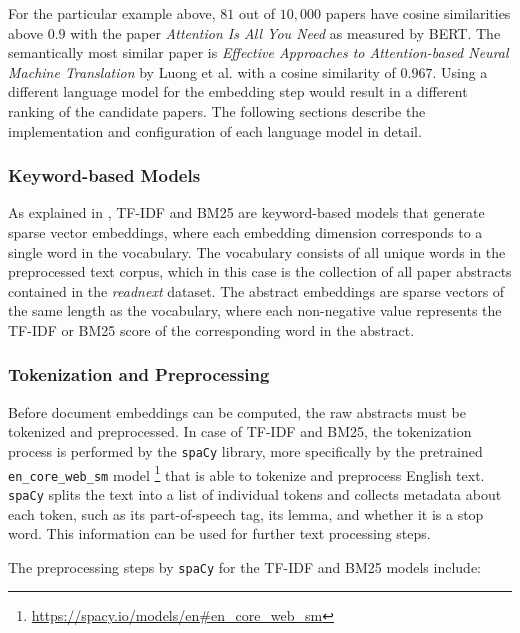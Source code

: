 For the particular example above, $81$ out of $10,000$ papers have cosine similarities above $0.9$ with the paper \emph{Attention Is All You Need} as measured by BERT. The semantically most similar paper is \emph{Effective Approaches to Attention-based Neural Machine Translation} by Luong et al. \cite{LuongEffectiveApproaches2015} with a cosine similarity of $0.967$.
Using a different language model for the embedding step would result in a different ranking of the candidate papers.
The following sections describe the implementation and configuration of each language model in detail.


\subsubsection*{Keyword-based Models}

As explained in , TF-IDF \cite{SaltonTermWeighting1987} and BM25 \cite{RobertsonOkapiTREC31995} are keyword-based models that generate sparse vector embeddings, where each embedding dimension corresponds to a single word in the vocabulary. The vocabulary consists of all unique words in the preprocessed text corpus, which in this case is the collection of all paper abstracts contained in the \emph{readnext} dataset.
The abstract embeddings are sparse vectors of the same length as the vocabulary, where each non-negative value represents the TF-IDF or BM25 score of the corresponding word in the abstract.


\subsubsection*{Tokenization and Preprocessing}

Before document embeddings can be computed, the raw abstracts must be tokenized and preprocessed. In case of TF-IDF and BM25, the tokenization process is performed by the \texttt{spaCy} \cite{HonnibalImprovedNonmonotonic2015} library, more specifically by the pretrained \texttt{en\_core\_web\_sm} model \footnote{\url{https://spacy.io/models/en\#en\_core\_web\_sm}} that is able to tokenize and preprocess English text. \texttt{spaCy} splits the text into a list of individual tokens and collects metadata about each token, such as its part-of-speech tag, its lemma, and whether it is a stop word. This information can be used for further text processing steps.

The preprocessing steps by \texttt{spaCy} for the TF-IDF and BM25 models include:

